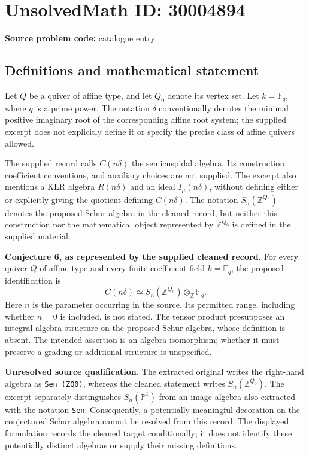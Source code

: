 \documentclass[11pt]{article}
\begin{document}
\section*{UnsolvedMath ID: 30004894}
\textbf{Source problem code:} catalogue entry
\subsection{Definitions and mathematical statement}
Let \(Q\) be a quiver of affine type, and let \(Q_0\) denote its vertex set. Let \(k=\mathbb F_q\), where \(q\) is a prime power. The notation \(\delta\) conventionally denotes the minimal positive imaginary root of the corresponding affine root system; the supplied excerpt does not explicitly define it or specify the precise class of affine quivers allowed.

The supplied record calls \(C(n\delta)\) the semicuspidal algebra. Its construction, coefficient conventions, and auxiliary choices are not supplied. The excerpt also mentions a KLR algebra \(R(n\delta)\) and an ideal \(I_\mu(n\delta)\), without defining either or explicitly giving the quotient defining \(C(n\delta)\). The notation \(S_n(\mathbb Z^{Q_0})\) denotes the proposed Schur algebra in the cleaned record, but neither this construction nor the mathematical object represented by \(\mathbb Z^{Q_0}\) is defined in the supplied material.

\textbf{Conjecture 6, as represented by the supplied cleaned record.} For every quiver \(Q\) of affine type and every finite coefficient field \(k=\mathbb F_q\), the proposed identification is
\[
 C(n\delta)\simeq S_n(\mathbb Z^{Q_0})\otimes_{\mathbb Z}\mathbb F_q.
\]
Here \(n\) is the parameter occurring in the source. Its permitted range, including whether \(n=0\) is included, is not stated. The tensor product presupposes an integral algebra structure on the proposed Schur algebra, whose definition is absent. The intended assertion is an algebra isomorphism; whether it must preserve a grading or additional structure is unspecified.

\textbf{Unresolved source qualification.} The extracted original writes the right-hand algebra as \texttt{Sen (ZQ0)}, whereas the cleaned statement writes \(S_n(\mathbb Z^{Q_0})\). The excerpt separately distinguishes \(S_n(\mathbb P^1)\) from an image algebra also extracted with the notation \texttt{Sen}. Consequently, a potentially meaningful decoration on the conjectured Schur algebra cannot be resolved from this record. The displayed formulation records the cleaned target conditionally; it does not identify these potentially distinct algebras or supply their missing definitions.
\end{document}
